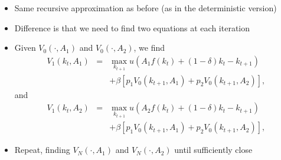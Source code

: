 \documentclass[notes=show]{beamer}
\begin{document}
\begin{frame}%


\begin{itemize}
\item Same recursive approximation as before (as in the deterministic
version)

\item Difference is that we need to find two equations at each iteration

\item Given $V_{0}(\cdot ,A_{1})$ and $V_{0}(\cdot ,A_{2})$, we find%
\begin{eqnarray*}
V_{1}(k_{t},A_{1}) &=&\max_{k_{t+1}}u(A_{1}f(k_{t})+(1-\delta )k_{t}-k_{t+1})
\\
&&+\beta \left[ p_{1}V_{0}\left( k_{t+1},A_{1}\right) +p_{2}V_{0}\left(
k_{t+1},A_{2}\right) \right] ,
\end{eqnarray*}%
and%
\begin{eqnarray*}
V_{1}(k_{t},A_{2}) &=&\max_{k_{t+1}}u(A_{2}f(k_{t})+(1-\delta )k_{t}-k_{t+1})
\\
&&+\beta \left[ p_{1}V_{0}\left( k_{t+1},A_{1}\right) +p_{2}V_{0}\left(
k_{t+1},A_{2}\right) \right] ,
\end{eqnarray*}

\item Repeat, finding $V_{N}(\cdot ,A_{1})$ and $V_{N}(\cdot ,A_{2})$ until
sufficiently close
\end{itemize}

\end{frame}%
\end{document}
